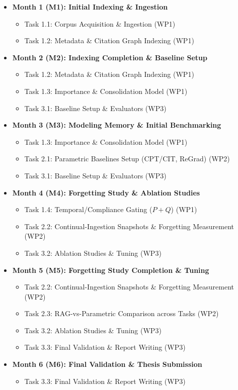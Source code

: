 \begin{itemize}[leftmargin=*]
    \item \textbf{Month 1 (M1): Initial Indexing \& Ingestion}
    \begin{itemize}
        \item Task 1.1: Corpus Acquisition \& Ingestion (WP1)
        \item Task 1.2: Metadata \& Citation Graph Indexing (WP1)
    \end{itemize}
    \item \textbf{Month 2 (M2): Indexing Completion \& Baseline Setup}
    \begin{itemize}
        \item Task 1.2: Metadata \& Citation Graph Indexing (WP1)
        \item Task 1.3: Importance \& Consolidation Model (WP1)
        \item Task 3.1: Baseline Setup \& Evaluators (WP3)
    \end{itemize}
    \item \textbf{Month 3 (M3): Modeling Memory \& Initial Benchmarking}
    \begin{itemize}
        \item Task 1.3: Importance \& Consolidation Model (WP1)
        \item Task 2.1: Parametric Baselines Setup (CPT/CIT, ReGrad) (WP2)
        \item Task 3.1: Baseline Setup \& Evaluators (WP3)
    \end{itemize}
    \item \textbf{Month 4 (M4): Forgetting Study \& Ablation Studies}
    \begin{itemize}
        \item Task 1.4: Temporal/Compliance Gating ($P{+}Q$) (WP1)
        \item Task 2.2: Continual-Ingestion Snapshots \& Forgetting Measurement (WP2)
        \item Task 3.2: Ablation Studies \& Tuning (WP3)
    \end{itemize}
    \item \textbf{Month 5 (M5): Forgetting Study Completion \& Tuning}
    \begin{itemize}
        \item Task 2.2: Continual-Ingestion Snapshots \& Forgetting Measurement (WP2)
        \item Task 2.3: RAG-vs-Parametric Comparison across Tasks (WP2)
        \item Task 3.2: Ablation Studies \& Tuning (WP3)
        \item Task 3.3: Final Validation \& Report Writing (WP3)
    \end{itemize}
    \item \textbf{Month 6 (M6): Final Validation \& Thesis Submission}
    \begin{itemize}
        \item Task 3.3: Final Validation \& Report Writing (WP3)
    \end{itemize}
\end{itemize}

